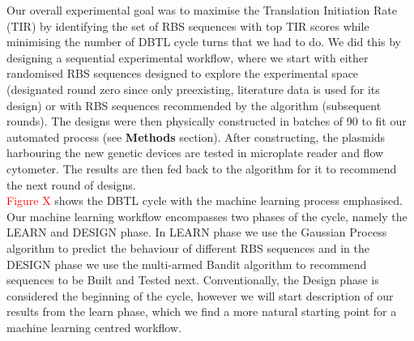 \documentclass{article}
\begin{document}
Our overall experimental goal was to maximise the Translation Initiation Rate (TIR) by identifying the set of RBS sequences with top TIR scores while minimising the number of DBTL cycle turns that we had to do. We did this by designing a sequential experimental workflow, where we start with either randomised RBS sequences designed to explore the experimental space (designated round zero since only preexisting, literature data is used for its design) or with RBS sequences recommended by the algorithm (subsequent rounds). The designs were then physically constructed in batches of 90 to fit our automated process (see \textbf{Methods} section). After constructing, the plasmids harbouring the new genetic devices are tested in microplate reader and flow cytometer. The results are then fed back to the algorithm for it to recommend the next round of designs.\\ \textcolor{red}{Figure X} shows the DBTL cycle with the machine learning process emphasised. Our machine learning workflow encompasses two phases of the cycle, namely the LEARN and DESIGN phase. In LEARN phase we use the Gaussian Process algorithm to predict the behaviour of different RBS sequences and in the DESIGN phase we use the multi-armed Bandit algorithm to recommend sequences to be Built and Tested next. Conventionally, the Design phase is considered the beginning of the cycle, however we will start description of our results from the learn phase, which we find a more natural starting point for a machine learning centred workflow.\\
\end{document}
